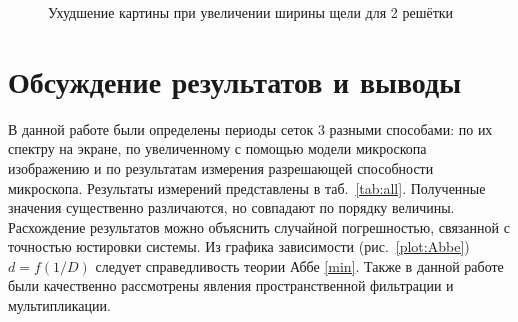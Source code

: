 \documentclass[a4paper, 12pt]{article}
\begin{document}
\begin{figure}[h!]
\begin{minipage}[h!]{0.3\linewidth}
		\end{minipage}
		\hfill
		\caption{Ухудшение картины при увеличении ширины щели для 2 решётки}
		\label{fig:grid_multi2}
\end{figure}

\section{Обсуждение результатов и выводы}

В данной работе были определены периоды сеток 3 разными способами: по их спектру на экране, по увеличенному с помощью модели микроскопа изображению и по результатам измерения разрешающей способности микроскопа. Результаты измерений представлены в таб.~\ref{tab:all}. Полученные значения существенно различаются, но совпадают по порядку величины. Расхождение результатов можно объяснить случайной погрешностью, связанной с точностью юстировки системы. Из графика зависимости (рис.~\ref{plot:Abbe}) $d = f(1/D)$ следует справедливость теории Аббе \eqref{min}. Также в данной работе были качественно рассмотрены явления пространственной фильтрации и мультипликации.
\end{document}
